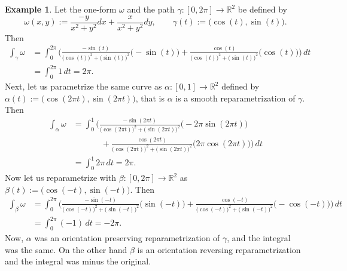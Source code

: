 \documentclass[12pt]{book}
\newcommand{\R}{{\mathbb{R}}}
\theoremstyle{plain}
\theoremstyle{remark}
\theoremstyle{definition}
\theoremstyle{exercise}
\theoremstyle{example}
\newtheorem{example}[thm]{Example}
\begin{document}
\begin{example} \label{example:mv:irrotoneformint}
Let the one-form $\omega$ and the path $\gamma \colon [0,2\pi] \to \R^2$ be defined by
\begin{equation*}
\omega(x,y) := \frac{-y}{x^2+y^2} dx + \frac{x}{x^2+y^2} dy,
\qquad
\gamma(t) := \bigl(\cos(t),\sin(t)\bigr) .
\end{equation*}
Then
\begin{equation*}
\begin{split}
\int_{\gamma} \omega
& =
\int_0^{2\pi}
\Biggl(
\frac{-\sin(t)}{{\bigl(\cos(t)\bigr)}^2+{\bigl(\sin(t)\bigr)}^2}
\bigl(-\sin(t)\bigr)
+
\frac{\cos(t)}{{\bigl(\cos(t)\bigr)}^2+{\bigl(\sin(t)\bigr)}^2}
\bigl(\cos(t)\bigr)
\Biggr) \, dt
\\
& =
\int_0^{2\pi}
1 \, dt
= 2\pi .
\end{split}
\end{equation*}
Next, let us parametrize the same curve as
$\alpha \colon [0,1] \to \R^2$ defined by $\alpha(t) := \bigl(\cos(2\pi
t),\sin(2 \pi t)\bigr)$, that is $\alpha$ is a smooth reparametrization of
$\gamma$.  Then
\begin{equation*}
\begin{split}
\int_{\alpha} \omega
& =
\int_0^{1}
\Biggl(
\frac{-\sin(2\pi t)}{{\bigl(\cos(2\pi t)\bigr)}^2+{\bigl(\sin(2\pi t)\bigr)}^2}
\bigl(-2\pi \sin(2\pi t)\bigr)
\\
& \phantom{=\int_0^1\Biggl(~}
+
\frac{\cos(2 \pi t)}{{\bigl(\cos(2 \pi t)\bigr)}^2+{\bigl(\sin(2 \pi t)\bigr)}^2}
\bigl(2 \pi \cos(2 \pi t)\bigr)
\Biggr) \, dt
\\
& =
\int_0^{1}
2\pi \, dt
= 2\pi .
\end{split}
\end{equation*}
Now let us reparametrize with $\beta \colon [0,2\pi] \to \R^2$
as $\beta(t) := \bigl(\cos(-t),\sin(-t)\bigr)$.  Then
\begin{equation*}
\begin{split}
\int_{\beta} \omega
& =
\int_0^{2\pi}
\Biggl(
\frac{-\sin(-t)}{{\bigl(\cos(-t)\bigr)}^2+{\bigl(\sin(-t)\bigr)}^2}
\bigl(\sin(-t)\bigr)
+
\frac{\cos(-t)}{{\bigl(\cos(-t)\bigr)}^2+{\bigl(\sin(-t)\bigr)}^2}
\bigl(-\cos(-t)\bigr)
\Biggr) \, dt
\\
& =
\int_0^{2\pi}
(-1) \, dt
= -2\pi .
\end{split}
\end{equation*}
Now, $\alpha$ was an orientation preserving reparametrization of
$\gamma$, and the integral was the same.  On the other hand $\beta$
is an orientation reversing reparametrization and the integral was
minus the original.
\end{example}
\end{document}
